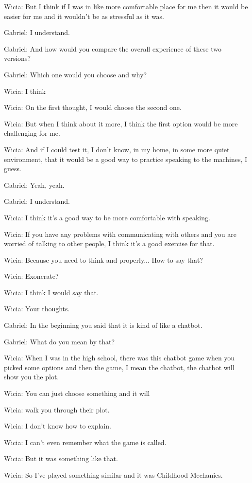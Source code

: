Wicia: But I think if I was in like more comfortable place for me then it would be easier for me and it wouldn't be as stressful as it was.

Gabriel: I understand.

Gabriel: And how would you compare the overall experience of these two versions?

Gabriel: Which one would you choose and why?

Wicia: I think

Wicia: On the first thought, I would choose the second one.

Wicia: But when I think about it more, I think the first option would be more challenging for me.

Wicia: And if I could test it, I don't know, in my home, in some more quiet environment, that it would be a good way to practice speaking to the machines, I guess.

Gabriel: Yeah, yeah.

Gabriel: I understand.

Wicia: I think it's a good way to be more comfortable with speaking.

Wicia: If you have any problems with communicating with others and you are worried of talking to other people, I think it's a good exercise for that.

Wicia: Because you need to think and properly... How to say that?

Wicia: Exonerate?

Wicia: I think I would say that.

Wicia: Your thoughts.

Gabriel: In the beginning you said that it is kind of like a chatbot.

Gabriel: What do you mean by that?

Wicia: When I was in the high school, there was this chatbot game when you picked some options and then the game, I mean the chatbot, the chatbot will show you the plot.

Wicia: You can just choose something and it will

Wicia: walk you through their plot.

Wicia: I don't know how to explain.

Wicia: I can't even remember what the game is called.

Wicia: But it was something like that.

Wicia: So I've played something similar and it was Childhood Mechanics.

